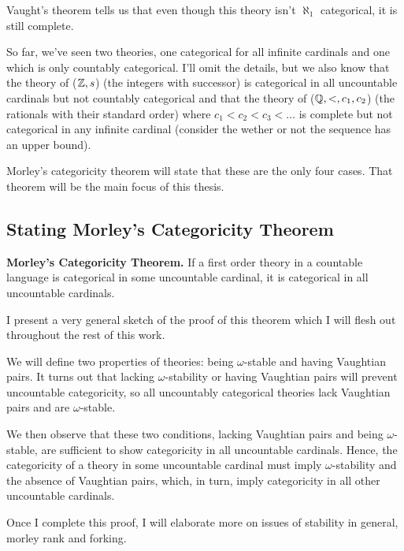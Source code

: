Vaught's theorem tells us that even though this theory isn't \(\aleph_1\) categorical, it is still complete. 

So far, we've seen two theories, one categorical for all infinite cardinals and one which is only countably categorical. 
I'll omit the details, but we also know that the theory of (\(\mathbb{Z}, s\)) (the integers with successor) is categorical in all uncountable cardinals but not countably categorical and that the theory of (\(\mathbb{Q}, <, c_1, c_2\)) (the rationals with their standard order) where \(c_1 < c_2 < c_3 < \ldots\) is complete but not categorical in any infinite cardinal (consider the wether or not the sequence has an upper bound). 

Morley's categoricity theorem will state that these are the only four cases. That theorem will be the main focus of this thesis. 

\subsection{Stating Morley's Categoricity Theorem}

\textbf{Morley's Categoricity Theorem.} If a first order theory in a countable language is categorical in some uncountable cardinal, it is categorical in all uncountable cardinals. 

I present a very general sketch of the proof of this theorem which I will flesh out throughout the rest of this work. 

We will define two properties of theories: being \(\omega\)-stable and having Vaughtian pairs. 
It turns out that lacking \(\omega\)-stability or having Vaughtian pairs will prevent uncountable categoricity, so all uncountably categorical theories lack Vaughtian pairs and are \(\omega\)-stable. 

We then observe that these two conditions, lacking Vaughtian pairs and being \(\omega\)-stable, are sufficient to show categoricity in all uncountable cardinals. 
Hence, the categoricity of a theory in some uncountable cardinal must imply \(\omega\)-stability and the absence of Vaughtian pairs, which, in turn, imply categoricity in all other uncountable cardinals. 

Once I complete this proof, I will elaborate more on issues of stability in general, morley rank and forking.  
